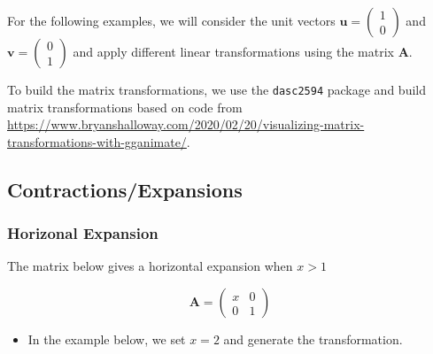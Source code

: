 \documentclass[
]{book}
\newenvironment{Shaded}{\begin{snugshade}}{\end{snugshade}}
\newcommand{\DecValTok}[1]{\textcolor[rgb]{0.00,0.00,0.81}{#1}}
\newcommand{\KeywordTok}[1]{\textcolor[rgb]{0.13,0.29,0.53}{\textbf{#1}}}
\newcommand{\NormalTok}[1]{#1}
\newcommand{\OperatorTok}[1]{\textcolor[rgb]{0.81,0.36,0.00}{\textbf{#1}}}
\newcommand{\StringTok}[1]{\textcolor[rgb]{0.31,0.60,0.02}{#1}}
\providecommand{\tightlist}{%
  \setlength{\itemsep}{0pt}\setlength{\parskip}{0pt}}
\theoremstyle{definition}
\theoremstyle{definition}
\theoremstyle{definition}
\theoremstyle{definition}
\theoremstyle{remark}
\begin{document}
For the following examples, we will consider the unit vectors \(\mathbf{u} = \begin{pmatrix} 1 \\ 0 \end{pmatrix}\) and \(\mathbf{v} = \begin{pmatrix} 0 \\ 1 \end{pmatrix}\) and apply different linear transformations using the matrix \(\mathbf{A}\).

To build the matrix transformations, we use the \texttt{dasc2594} package and build matrix transformations based on code from \url{https://www.bryanshalloway.com/2020/02/20/visualizing-matrix-transformations-with-gganimate/}.

\hypertarget{contractionsexpansions}{%
\subsection{Contractions/Expansions}\label{contractionsexpansions}}

\hypertarget{horizonal-expansion}{%
\subsubsection{Horizonal Expansion}\label{horizonal-expansion}}

The matrix below gives a horizontal expansion when \(x > 1\)

\[
\mathbf{A} = \begin{pmatrix}
x & 0 \\
0 & 1
\end{pmatrix}
\]

\begin{itemize}
\tightlist
\item
  In the example below, we set \(x = 2\) and generate the transformation.
\end{itemize}

\begin{Shaded}
\end{Shaded}
\end{document}
